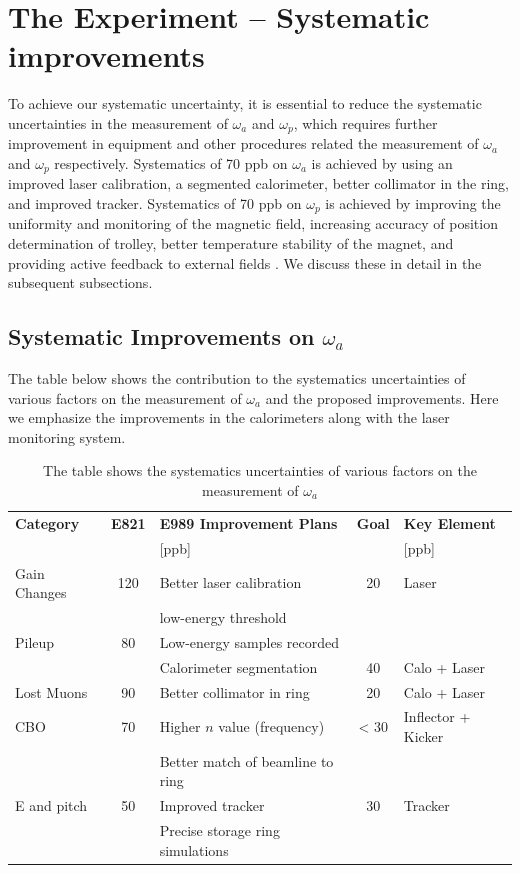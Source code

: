 \documentclass[journal,article,submit,moreauthors,pdftex,10pt,a4paper]{Definitions/mdpi}
\begin{document}
\section{The Experiment – Systematic improvements}
To achieve our systematic uncertainty, it is essential to reduce the systematic uncertainties in the 
measurement of $\omega_a$ and $\omega_p$, which requires further improvement in equipment 
and other procedures related the measurement of $\omega_a$ and $\omega_p$ respectively. 
Systematics of 70 ppb on $\omega_a$ is achieved by using an improved laser calibration,
a segmented calorimeter, better collimator in the ring, and improved tracker. 
Systematics of 70 ppb on $\omega_p$ is achieved by improving
the uniformity and monitoring of the magnetic field, increasing accuracy
of position determination of trolley, better temperature stability of the magnet,
and providing active feedback to external fields \cite{wes}.
We discuss these in detail in the subsequent subsections.

\subsection{Systematic Improvements on $\omega_a$}
The table below shows the contribution to the systematics uncertainties 
of various factors on the measurement of $\omega_a$  and the proposed improvements. 
Here we emphasize the improvements in the calorimeters along with the laser monitoring system. 
\begin{table}[H]
\caption{The table shows the systematics uncertainties of various factors on the measurement of $\omega_a$ }
\centering
\begin{tabular}{lclcl}%
\toprule
\textbf{Category}	& \textbf{E821}	& \textbf{E989 Improvement Plans} & \textbf{Goal} & \textbf{Key Element}\\
&  & [ppb]  &   & [ppb] & \\
\midrule
Gain Changes	& 120	& Better laser calibration  & 20 & Laser\\
    &     & low-energy threshold &   & \\
Pileup	& 80    & Low-energy samples recorded  &  & \\ 
    &    & Calorimeter segmentation & 40 &Calo + Laser\\
Lost Muons	& 90    & Better collimator in ring & 20 & Calo + Laser\\
CBO	& 70    & Higher $n$ value (frequency) & < 30 & Inflector + Kicker\\
 &    & Better match of beamline to ring &  &\\
E and pitch & 50 & Improved tracker & 30 & Tracker\\
&   & Precise storage ring simulations &  & \\
\bottomrule
\end{tabular}
\end{table}
\end{document}
